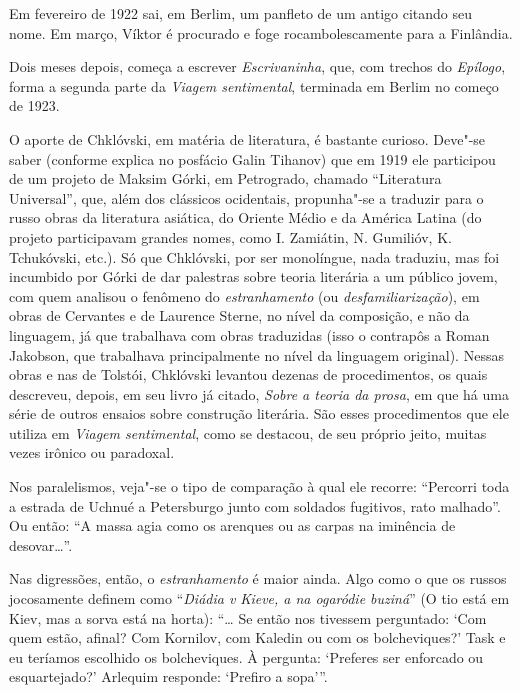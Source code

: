 Em fevereiro de 1922 sai, em Berlim, um panfleto de um antigo
 citando seu nome. Em março, Víktor é procurado e
foge rocambolescamente para a Finlândia.

Dois meses depois, começa a escrever \emph{Escrivaninha}, que,
com trechos do \emph{Epílogo}, forma a segunda parte da
\emph{Viagem sentimental}, terminada em Berlim no começo de 1923.

O aporte de Chklóvski, em matéria de literatura, é bastante
curioso. Deve"-se saber (conforme explica no posfácio Galin
Tihanov) que em 1919 ele participou de um projeto de Maksim
Górki, em Petrogrado, chamado ``Literatura
Universal'', que, além dos clássicos ocidentais, propunha"-se
a traduzir para o russo obras da literatura asiática, do Oriente
Médio e da América Latina (do projeto participavam grandes nomes,
como I. Zamiátin, N. Gumilióv, K. Tchukóvski, etc.). Só que
Chklóvski, por ser monolíngue, nada traduziu, mas foi incumbido
por Górki de dar palestras sobre teoria literária a um público
jovem, com quem analisou o fenômeno do \emph{estranhamento}
(ou \emph{desfamiliarização}), em obras de Cervantes e de
Laurence Sterne, no nível da composição, e não da linguagem,
já que trabalhava com obras traduzidas (isso o contrapôs a
Roman Jakobson, que trabalhava principalmente no nível da
linguagem original). Nessas obras e nas de Tolstói, Chklóvski
levantou dezenas de procedimentos, os quais descreveu, depois,
em seu livro já citado, \emph{Sobre a teoria da prosa}, em que
há uma série de outros ensaios sobre construção literária. São
esses procedimentos que ele utiliza em \emph{Viagem sentimental},
como se destacou, de seu próprio jeito, muitas vezes irônico
ou paradoxal.

Nos paralelismos, veja"-se o tipo de comparação à qual ele
recorre: ``Percorri toda a estrada de Uchnué a Petersburgo
junto com soldados fugitivos, rato malhado''. Ou então: ``A
massa agia como os arenques ou as carpas na iminência de
desovar\ldots{}''.

Nas digressões, então, o \emph{estranhamento} é maior ainda. Algo
como o que os russos jocosamente definem como ``\emph{Diádia v
Kieve, a na ogaródie buziná}'' (O tio está em Kiev, mas a sorva
está na horta): ``\ldots{} Se então nos tivessem perguntado: `Com
quem estão, afinal? Com Kornilov, com Kaledin ou com os bolcheviques?'
Task e eu teríamos escolhido os bolcheviques. À pergunta: ‘Preferes
ser enforcado ou esquartejado?’ Arlequim responde: ‘Prefiro a
sopa’''.

